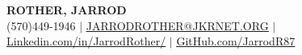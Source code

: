 \documentclass[11pt, letterpaper]{article}
\begin{document}


\begin{center}
  \textbf{\Huge \scshape ROTHER, JARROD} \\ \vspace{1pt} %
   \small (570)449-1946 $|$ 
   \href{mailto:JARRODROTHER@JKRNET.ORG}{\underline{JARRODROTHER@JKRNET.ORG}} $|$\\
   \href{https://www.linkedin.com/in/jarrodrother/}{\underline{Linkedin.com/in/JarrodRother/}} $|$
   \href{https://github.com/JarrodR87}{\underline{GitHub.com/JarrodR87}}
\end{center}


\end{document}
